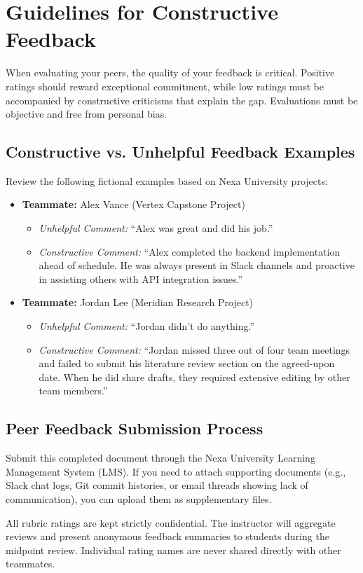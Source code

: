 \section{Guidelines for Constructive Feedback}

When evaluating your peers, the quality of your feedback is critical. Positive ratings should reward exceptional commitment, while low ratings must be accompanied by constructive criticisms that explain the gap. Evaluations must be objective and free from personal bias.

\subsection{Constructive vs. Unhelpful Feedback Examples}

Review the following fictional examples based on Nexa University projects:

\begin{itemize}
    \item \textbf{Teammate:} Alex Vance (Vertex Capstone Project)
    \begin{itemize}
        \item \textit{Unhelpful Comment:} ``Alex was great and did his job.''
        \item \textit{Constructive Comment:} ``Alex completed the backend implementation ahead of schedule. He was always present in Slack channels and proactive in assisting others with API integration issues.''
    \end{itemize}
    \item \textbf{Teammate:} Jordan Lee (Meridian Research Project)
    \begin{itemize}
        \item \textit{Unhelpful Comment:} ``Jordan didn't do anything.''
        \item \textit{Constructive Comment:} ``Jordan missed three out of four team meetings and failed to submit his literature review section on the agreed-upon date. When he did share drafts, they required extensive editing by other team members.''
    \end{itemize}
\end{itemize}

\subsection{Peer Feedback Submission Process}

Submit this completed document through the Nexa University Learning Management System (LMS). If you need to attach supporting documents (e.g., Slack chat logs, Git commit histories, or email threads showing lack of communication), you can upload them as supplementary files. 

All rubric ratings are kept strictly confidential. The instructor will aggregate reviews and present anonymous feedback summaries to students during the midpoint review. Individual rating names are never shared directly with other teammates.
